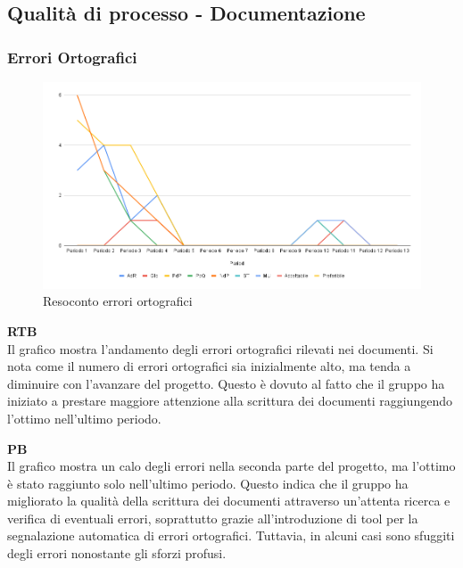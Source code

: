 \subsection{Qualità di processo - Documentazione}

\vspace{0.3cm}

\subsubsection{Errori Ortografici}

\vspace{0.3cm}

\begin{figure}[H]
    \centering
    \includegraphics[width=1\textwidth]{../Images/PianoDiQualifica/errori_ortografici.png}
    \caption{Resoconto errori ortografici}
    \label{fig:Errori ortografici}
\end{figure}

\vspace{0.2cm}

\textbf{RTB} \\
Il grafico mostra l'andamento degli errori ortografici rilevati nei documenti. Si nota come il numero di errori ortografici sia inizialmente alto, ma tenda a diminuire con l'avanzare del progetto.
Questo è dovuto al fatto che il gruppo ha iniziato a prestare maggiore attenzione alla scrittura dei documenti raggiungendo l'ottimo nell'ultimo periodo.

\vspace{0.3cm}

\textbf{PB} \\
Il grafico mostra un calo degli errori nella seconda parte del progetto, ma l'ottimo è stato raggiunto solo nell'ultimo periodo. Questo indica che il gruppo ha migliorato la qualità della scrittura dei documenti attraverso un'attenta ricerca e verifica di eventuali errori, soprattutto grazie all'introduzione di tool per la segnalazione automatica di errori ortografici. Tuttavia, in alcuni casi sono sfuggiti degli errori nonostante gli sforzi profusi.

